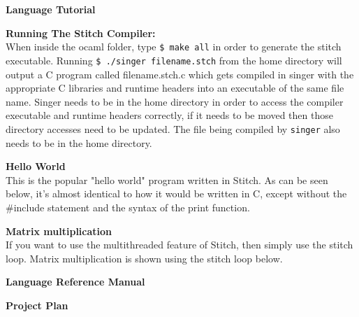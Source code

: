 \documentclass[11pt, oneside]{article}   	%
\newcommand{\tab} {\hspace*{2em}}
\begin{document}
\newpage

\LARGE\textbf{Language Tutorial}\\[2em]
\normalsize

\Large\textbf{Running The Stitch Compiler:}\\[1em]
\normalsize
\tab When inside the ocaml folder, type \verb|$ make all| in order to generate the stitch executable. Running \verb|$ ./singer filename.stch|  from the home directory will output a C program called filename.stch.c which gets compiled in singer with the appropriate C libraries and runtime headers into an executable of the same file name. Singer needs to be in the home directory in order to access the compiler executable and runtime headers correctly, if it needs to be moved then those directory accesses need to be updated.  The file being compiled by \verb|singer| also needs to be in the home directory.

\newpage

\Large\textbf{Hello World}\\[1em]
\normalsize
\tab This is the popular "hello world" program written in Stitch. As can be seen below, it's almost identical to how it would be written in C, except without the \#include statement and the syntax of the print function.


\newpage

\Large\textbf{Matrix multiplication}\\[1em]
\normalsize
\tab If you want to use the multithreaded feature of Stitch, then simply use the stitch loop. Matrix multiplication is shown using the stitch loop below.


\newpage

\LARGE\textbf{Language Reference Manual}\\[2em]
\normalsize

\newpage
\tab
\newpage
\tab
\newpage
\tab
\newpage
\tab
\newpage
\tab
\newpage
\tab
\newpage
\tab
\newpage
\tab
\newpage
\tab
\newpage
\tab
\newpage
\tab
\newpage
\tab
\newpage
\tab
\newpage

\LARGE\textbf{Project Plan}\\[2em]
\normalsize
\end{document}

